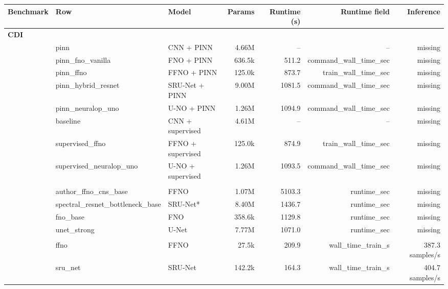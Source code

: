 \begin{tabular}{lllrrrr}
\toprule
Benchmark & Row & Model & Params & Runtime (s) & Runtime field & Inference \\
\midrule
\multicolumn{7}{l}{\textbf{CDI}} \\
 & pinn & CNN + PINN & 4.66M & -- & -- & missing \\
 & pinn\_fno\_vanilla & FNO + PINN & 636.5k & 511.2 & command\_wall\_time\_sec & missing \\
 & pinn\_ffno & FFNO + PINN & 125.0k & 873.7 & train\_wall\_time\_sec & missing \\
 & pinn\_hybrid\_resnet & SRU-Net + PINN & 9.00M & 1081.5 & command\_wall\_time\_sec & missing \\
 & pinn\_neuralop\_uno & U-NO + PINN & 1.26M & 1094.9 & command\_wall\_time\_sec & missing \\
 & baseline & CNN + supervised & 4.61M & -- & -- & missing \\
 & supervised\_ffno & FFNO + supervised & 125.0k & 874.9 & train\_wall\_time\_sec & missing \\
 & supervised\_neuralop\_uno & U-NO + supervised & 1.26M & 1093.5 & command\_wall\_time\_sec & missing \\
\addlinespace
\multicolumn{7}{l}{\textbf{PDEBench CNS}} \\
 & author\_ffno\_cns\_base & FFNO & 1.07M & 5103.3 & runtime\_sec & missing \\
 & spectral\_resnet\_bottleneck\_base & SRU-Net* & 8.40M & 1436.7 & runtime\_sec & missing \\
 & fno\_base & FNO & 358.6k & 1129.8 & runtime\_sec & missing \\
 & unet\_strong & U-Net & 7.77M & 1071.0 & runtime\_sec & missing \\
\addlinespace
\multicolumn{7}{l}{\textbf{BRDT}} \\
 & ffno & FFNO & 27.5k & 209.9 & wall\_time\_train\_s & 387.3 samples/s \\
 & sru\_net & SRU-Net & 142.2k & 164.3 & wall\_time\_train\_s & 404.7 samples/s \\
\bottomrule
\end{tabular}
